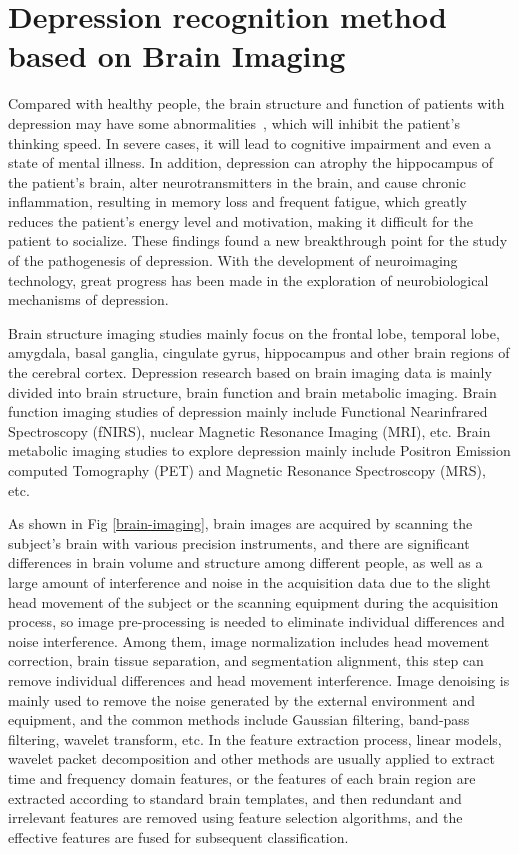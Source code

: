 
\ifx\allfiles\undefined
    
\fi

\section{Depression recognition method based on Brain Imaging}
\label{sec_approach}
Compared with healthy people, the brain structure and function of patients with depression may have some abnormalities~\cite{2018Neural}, which will inhibit the patient's thinking speed. In severe cases, it will lead to cognitive impairment and even a state of mental illness.
In addition, depression can atrophy the hippocampus of the patient's brain, alter neurotransmitters in the brain, and cause chronic inflammation, resulting in memory loss and frequent fatigue, which greatly reduces the patient's energy level and motivation, making it difficult for the patient to socialize.
These findings found a new breakthrough point for the study of the pathogenesis of depression. With the development of neuroimaging technology, great progress has been made in the exploration of neurobiological mechanisms of depression.

Brain structure imaging studies mainly focus on the frontal lobe, temporal lobe, amygdala, basal ganglia, cingulate gyrus, hippocampus and other brain regions of the cerebral cortex.
Depression research based on brain imaging data is mainly divided into brain structure, brain function and brain metabolic imaging.
Brain function imaging studies of depression mainly include Functional Nearinfrared Spectroscopy (fNIRS), nuclear Magnetic Resonance Imaging (MRI), etc. Brain metabolic imaging studies to explore depression mainly include Positron Emission computed Tomography (PET) and Magnetic Resonance Spectroscopy (MRS), etc.

As shown in Fig \ref{brain-imaging}, brain images are acquired by scanning the subject's brain with various precision instruments, and there are significant differences in brain volume and structure among different people, as well as a large amount of interference and noise in the acquisition data due to the slight head movement of the subject or the scanning equipment during the acquisition process, so image pre-processing is needed to eliminate individual differences and noise interference. Among them, image normalization includes head movement correction, brain tissue separation, and segmentation alignment, this step can remove individual differences and head movement interference. Image denoising is mainly used to remove the noise generated by the external environment and equipment, and the common methods include Gaussian filtering, band-pass filtering, wavelet transform, etc. In the feature extraction process, linear models, wavelet packet decomposition and other methods are usually applied to extract time and frequency domain features, or the features of each brain region are extracted according to standard brain templates, and then redundant and irrelevant features are removed using feature selection algorithms, and the effective features are fused for subsequent classification.

